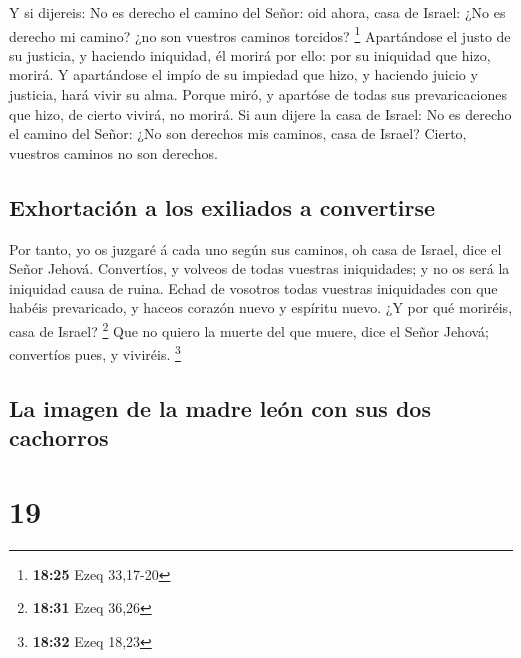  Y si dijereis: No es derecho el camino del Señor: oid
ahora, casa de Israel: ¿No es derecho mi camino? ¿no son vuestros
caminos torcidos? \footnote{\textbf{18:25} Ezeq 33,17-20} 
Apartándose el justo de su justicia, y haciendo iniquidad, él morirá por
ello: por su iniquidad que hizo, morirá.  Y apartándose el
impío de su impiedad que hizo, y haciendo juicio y justicia, hará vivir
su alma.  Porque miró, y apartóse de todas sus
prevaricaciones que hizo, de cierto vivirá, no morirá.  Si
aun dijere la casa de Israel: No es derecho el camino del Señor: ¿No son
derechos mis caminos, casa de Israel? Cierto, vuestros caminos no son
derechos.

\hypertarget{exhortaciuxf3n-a-los-exiliados-a-convertirse}{%
\subsection{Exhortación a los exiliados a
convertirse}\label{exhortaciuxf3n-a-los-exiliados-a-convertirse}}

 Por tanto, yo os juzgaré á cada uno según sus caminos, oh
casa de Israel, dice el Señor Jehová. Convertíos, y volveos de todas
vuestras iniquidades; y no os será la iniquidad causa de ruina.
 Echad de vosotros todas vuestras iniquidades con que
habéis prevaricado, y haceos corazón nuevo y espíritu nuevo. ¿Y por qué
moriréis, casa de Israel? \footnote{\textbf{18:31} Ezeq 36,26}
 Que no quiero la muerte del que muere, dice el Señor
Jehová; convertíos pues, y viviréis. \footnote{\textbf{18:32} Ezeq 18,23}

\hypertarget{la-imagen-de-la-madre-leuxf3n-con-sus-dos-cachorros}{%
\subsection{La imagen de la madre león con sus dos
cachorros}\label{la-imagen-de-la-madre-leuxf3n-con-sus-dos-cachorros}}

\hypertarget{section-18}{%
\section{19}\label{section-18}}

